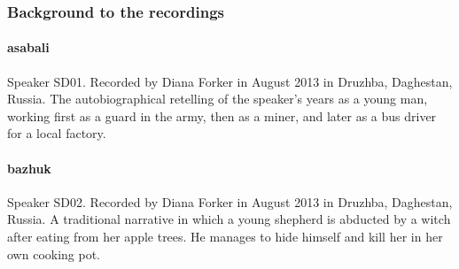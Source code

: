 \subsubsection*{Background to the recordings}

\paragraph{asabali}
Speaker SD01. Recorded by Diana Forker in August 2013 in Druzhba, Daghestan, Russia. The autobiographical retelling of the speaker's years as a young man, working first as a guard in the army, then as a miner, and later as a bus driver for a local factory.

%

\paragraph{bazhuk}
Speaker SD02. Recorded by Diana Forker in August 2013 in Druzhba, Daghestan, Russia. A traditional narrative in which a young shepherd is abducted by a witch after eating from her apple trees. He manages to hide himself and kill her in her own cooking pot.

%

